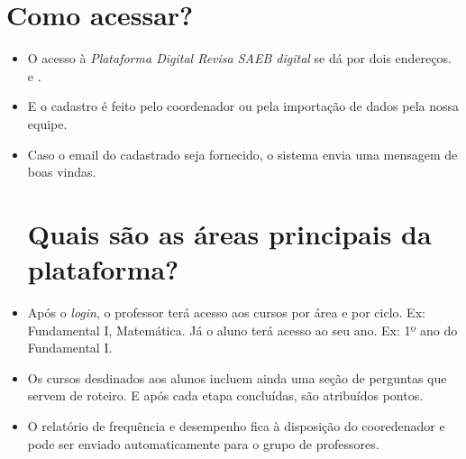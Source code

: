 \section{Como acessar?} 

\begin{itemize}
\item O acesso à \textit{Plataforma Digital Revisa SAEB digital} se dá por dois endereços.  e .

\item E o cadastro é feito pelo coordenador ou pela importação de dados pela nossa equipe.

\item Caso o email do cadastrado seja fornecido, o sistema envia uma mensagem de boas vindas. 

\section{Quais são as áreas principais da plataforma?}

\item Após o \textit{login}, o professor terá acesso aos cursos por área e por ciclo. Ex:
Fundamental I, Matemática. Já o aluno terá acesso ao seu ano. Ex: 1º ano do Fundamental I.

\item Os cursos desdinados aos alunos incluem ainda uma seção de perguntas que servem de roteiro.
E após cada etapa concluídas, são atribuídos pontos. 

\item O relatório de frequência e desempenho fica à disposição do cooredenador e pode ser 
enviado automaticamente para o grupo de professores. 

\end{itemize}






